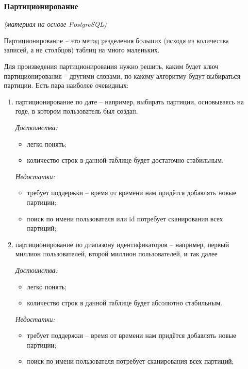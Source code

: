 \subsubsection{Партиционирование}
\textit{(материал на основе PostgreSQL)}

Партиционирование – это метод разделения больших (исходя из количества записей, а не столбцов) таблиц на много маленьких.

Для произведения партиционирования нужно решить, каким будет ключ партиционирования – другими словами, по какому алгоритму будут выбираться партиции. Есть пара наиболее очевидных: 
\begin{enumerate}
	\item партиционирование по дате – например, выбирать партиции, основываясь на годе, в котором пользователь был создан.
	
	\textit{Достоинства:}
	\begin{itemize}[label=--]
		\item легко понять;
		\item количество строк в данной таблице будет достаточно стабильным.
	\end{itemize}
	
	\textit{Недостатки:}
	\begin{itemize}[label=--]
		\item требует поддержки – время от времени нам придётся добавлять новые партиции;
		\item поиск по имени пользователя или id потребует сканирования всех партиций;
	\end{itemize}
	
	\item партиционирование по диапазону идентификаторов – например, первый миллион пользователей, второй миллион пользователей, и так далее
	
	\textit{Достоинства:}
	\begin{itemize}[label=--]
		\item легко понять;
		\item количество строк в данной таблице будет абсолютно стабильным.
	\end{itemize}
	
	\textit{Недостатки:}
	\begin{itemize}[label=--]
		\item требует поддержки – время от времени нам придётся добавлять новые партиции;
		\item поиск по имени пользователя потребует сканирования всех партиций; 
	\end{itemize}
	

\end{enumerate}
